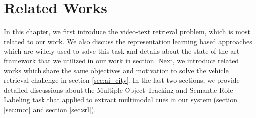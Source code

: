 \chapter{Related Works}
\label{chap-related-works}
\begin{ChapAbstract}
In this chapter, we first introduce the video-text retrieval problem, which is most related to our work. We also discuss the representation learning based approaches which are widely used to solve this task and details about the state-of-the-art framework that we utilized in our work in section. 
Next, we introduce related works which share the same objectives and motivation to solve the vehicle retrieval challenge in section \ref{sec:ai_city}.
In the last two sections, we provide detailed discussions about the Multiple Object Tracking and Semantic Role Labeling task that applied to extract multimodal cues in our system (section \ref{sec:mot} and section \ref{sec:srl}).
\end{ChapAbstract}




